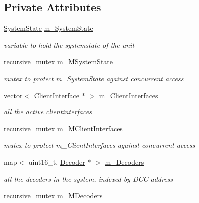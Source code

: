 \subsection*{Private Attributes}
\begin{DoxyCompactItemize}
\item 
\hyperlink{structTBT_1_1SystemState}{System\+State} \hyperlink{classTBT_1_1Manager_a21b7ad1a3360959eb90df2965c1d38ea_a21b7ad1a3360959eb90df2965c1d38ea}{m\+\_\+\+System\+State}
\begin{DoxyCompactList}\small\item\em variable to hold the systemstate of the unit \end{DoxyCompactList}\item 
recursive\+\_\+mutex \hyperlink{classTBT_1_1Manager_a7d8f3b83e123244f27ed4d75421ab016_a7d8f3b83e123244f27ed4d75421ab016}{m\+\_\+\+M\+System\+State}
\begin{DoxyCompactList}\small\item\em mutex to protect m\+\_\+\+System\+State against concurrent access \end{DoxyCompactList}\item 
vector$<$ \hyperlink{classTBT_1_1ClientInterface}{Client\+Interface} $\ast$ $>$ \hyperlink{classTBT_1_1Manager_a891445980d26bff2cb101a96ffadb36d_a891445980d26bff2cb101a96ffadb36d}{m\+\_\+\+Client\+Interfaces}
\begin{DoxyCompactList}\small\item\em all the active clientinterfaces \end{DoxyCompactList}\item 
recursive\+\_\+mutex \hyperlink{classTBT_1_1Manager_a07202ce2904cf24a4b5127ff12d54834_a07202ce2904cf24a4b5127ff12d54834}{m\+\_\+\+M\+Client\+Interfaces}
\begin{DoxyCompactList}\small\item\em mutex to protect m\+\_\+\+Client\+Interfaces against concurrent access \end{DoxyCompactList}\item 
map$<$ uint16\+\_\+t, \hyperlink{classTBT_1_1Decoder}{Decoder} $\ast$ $>$ \hyperlink{classTBT_1_1Manager_a37238f0b1b6d04d9a405f66f560c8d1a_a37238f0b1b6d04d9a405f66f560c8d1a}{m\+\_\+\+Decoders}
\begin{DoxyCompactList}\small\item\em all the decoders in the system, indexed by D\+CC address \end{DoxyCompactList}\item 
recursive\+\_\+mutex \hyperlink{classTBT_1_1Manager_a784fe0e0a20a0c7d0832186abe245f78_a784fe0e0a20a0c7d0832186abe245f78}{m\+\_\+\+M\+Decoders}

\end{DoxyCompactItemize}
